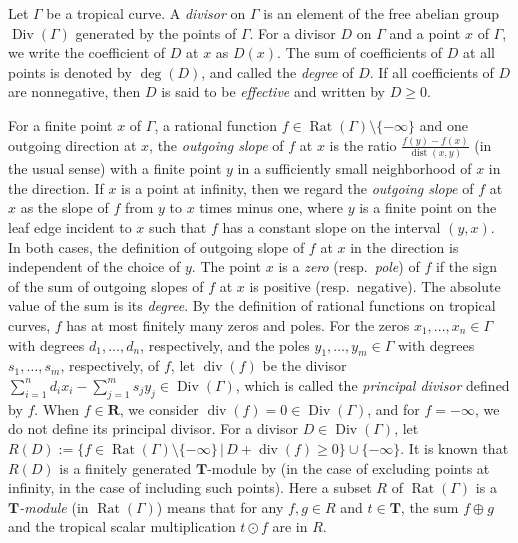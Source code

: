 \documentclass[a4paper,12pt]{amsart}
\def\Gamma{\varGamma}
\begin{document}
Let $\Gamma$ be a tropical curve.
A \textit{divisor} on $\Gamma$ is an element of the free abelian group $\operatorname{Div}(\Gamma)$ generated by the points of $\Gamma$.
For a divisor $D$ on $\Gamma$ and a point $x$ of $\Gamma$, we write the coefficient of $D$ at $x$ as $D(x)$.
The sum of coefficients of $D$ at all points is denoted by $\operatorname{deg}(D)$, and called the \textit{degree} of $D$.
If all coefficients of $D$ are nonnegative, then $D$ is said to be \textit{effective} and written by $D \ge 0$.

For a finite point $x$ of $\Gamma$, a rational function $f \in \operatorname{Rat}(\Gamma) \setminus \{ -\infty \}$ and one outgoing direction at $x$, the \textit{outgoing slope} of $f$ at $x$ is the ratio $\frac{f(y) - f(x)}{\operatorname{dist}(x,y)}$ (in the usual sense) with a finite point $y$ in a sufficiently small neighborhood of $x$ in the direction.
If $x$ is a point at infinity, then we regard the \textit{outgoing slope} of $f$ at $x$ as the slope of $f$ from $y$ to $x$ times minus one, where $y$ is a finite point on the leaf edge incident to $x$ such that $f$ has a constant slope on the interval $(y, x)$.
In both cases, the definition of outgoing slope of $f$ at $x$ in the direction is independent of the choice of $y$.
The point $x$ is a \textit{zero} (resp.~\textit{pole}) of $f$ if the sign of the sum of outgoing slopes of $f$ at $x$ is positive (resp.~negative).
The absolute value of the sum is its \textit{degree}.
By the definition of rational functions on tropical curves, $f$ has at most finitely many zeros and poles.
For the zeros $x_1, \ldots, x_n \in \Gamma$ with degrees $d_1, \ldots, d_n$, respectively, and the poles $y_1, \ldots, y_m \in \Gamma$ with degrees $s_1, \ldots, s_m$, respectively, of $f$, let $\operatorname{div}(f)$ be the divisor $\sum_{i = 1}^n d_i x_i - \sum_{j = 1}^m s_j y_j \in \operatorname{Div}(\Gamma)$, which is called the \textit{principal divisor} defined by $f$.
When $f \in \boldsymbol{R}$, we consider $\operatorname{div}(f) = 0 \in \operatorname{Div}(\Gamma)$, and for $f = -\infty$, we do not define its principal divisor.
For a divisor $D \in \operatorname{Div}(\Gamma)$, let $R(D) := \{ f \in \operatorname{Rat}(\Gamma) \setminus \{ -\infty \} \,|\, D + \operatorname{div}(f) \ge 0 \} \cup \{ -\infty \}$.
It is known that $R(D)$ is a finitely generated $\boldsymbol{T}$-module by \cite[Theorem~6]{Haase=Musiker=Yu} (in the case of excluding points at infinity, \cite[Theorem~3.15]{JuAe6} in the case of including such points).
Here a subset $R$ of $\operatorname{Rat}(\Gamma)$ is a \textit{$\boldsymbol{T}$-module} (in $\operatorname{Rat}(\Gamma)$) means that for any $f, g \in R$ and $t \in \boldsymbol{T}$, the sum $f \oplus g$ and the tropical scalar multiplication $t \odot f$ are in $R$.
\end{document}
